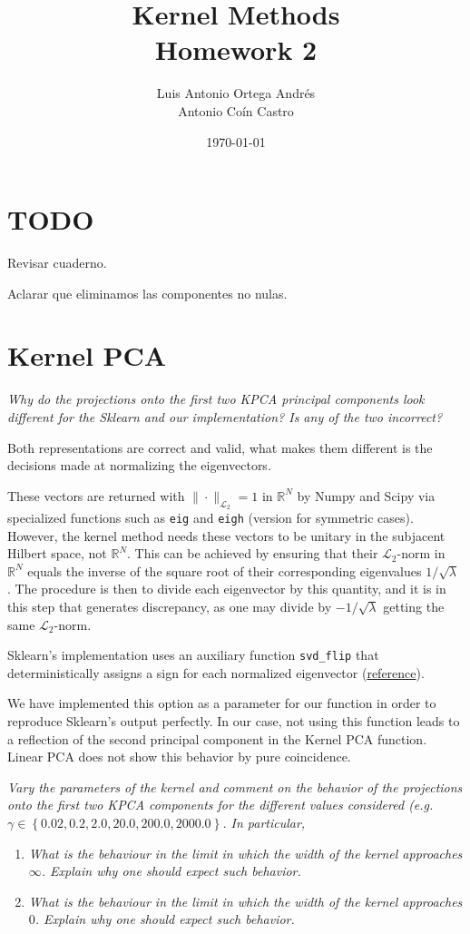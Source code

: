 \documentclass[11pt]{article}
\author{Luis Antonio Ortega Andrés\\Antonio Coín Castro}
\date{\today}
\title{Kernel Methods\\\medskip
\large Homework 2}
\begin{document}
\maketitle

\section{TODO}

Revisar cuaderno.

Aclarar que eliminamos las componentes no nulas.

\section*{Kernel PCA}

\emph{Why do the projections onto the first two KPCA principal components look different for the Sklearn and our implementation? Is any of the two incorrect?}

Both representations are correct and valid, what makes them different is the decisions made at normalizing the eigenvectors. 

These vectors are returned with \(\|\cdot \|_{\mathcal{L}_2} = 1\) in \( \mathbb{R}^N \)  by Numpy and Scipy via specialized functions such as \texttt{eig} and \texttt{eigh} (version for symmetric cases). However, the kernel method needs these vectors to be unitary in the subjacent Hilbert space, not \( \mathbb{R}^N \). This can be achieved by ensuring that their \( \mathcal{L}_2 \)-norm in \( \mathbb{R}^N \)  equals the inverse of the square root of their corresponding eigenvalues \( 1/\sqrt{\lambda} \) . The procedure is then to divide each eigenvector by this quantity, and it is in this step that generates discrepancy, as one may divide by \( -1/\sqrt{\lambda} \) getting the same \( \mathcal{L}_2 \)-norm.

Sklearn's implementation uses an auxiliary function \texttt{svd\_flip} that deterministically assigns a sign for each normalized eigenvector (\href{https://github.com/scikit-learn/scikit-learn/blob/15c2c72e27c6ea18566f4e786506c7a3aef8a5de/sklearn/utils/extmath.py#L504}{reference}). 

We have implemented this option as a parameter for our function in order to reproduce Sklearn's output perfectly. In our case, not using this function leads to a reflection of the second principal component in the Kernel PCA function. Linear PCA does not show this behavior by pure coincidence.

\emph{Vary the parameters of the kernel and comment on the behavior of the projections onto the first two KPCA components for the different values considered (e.g. $\gamma \in \left\{0.02, 0.2, 2.0, 20.0, 200.0, 2000.0\right\}$. In particular,}
\begin{enumerate}
    \item \emph{What is the behaviour in the limit in which the width of the kernel approaches $\infty$. Explain why one should expect such behavior.}
    \item \emph{What is the behaviour in the limit in which the width of the kernel approaches $0$. Explain why one should expect such behavior.}
\end{enumerate}
\end{document}
